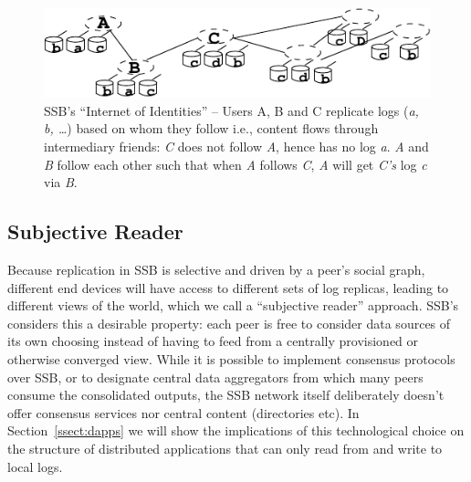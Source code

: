 \documentclass[10pt,sigconf,rewiew]{acmart}
\begin{document}
\begin{figure}[htb]
  \includegraphics[width=0.9\columnwidth]{figs/net-of-people.pdf}
  \caption{SSB's ``Internet of Identities'' -- {\rm\small Users A, B and C
    replicate logs ({\em a, b, \ldots}) based on whom they follow i.e., content
    flows through intermediary friends: {\em C} does not follow {\em A}, hence has no log {\em a}. {\em A} and {\em B} follow each other such that when {\em A} follows {\em C}, {\em A} will get {\em C's} log {\em c} via {\em B}.}\label{fig:net-of-people}}
\end{figure}


\subsection*{Subjective Reader}

Because replication in SSB is selective and driven by a peer's
social graph, different end devices will have access to different sets
of log replicas, leading to different views of the world, which we call
a ``subjective reader'' approach. SSB's considers this a desirable
property: each peer is free to
consider data sources of its own choosing instead of having to feed
from a centrally provisioned or otherwise converged view. While it is
possible to implement consensus protocols over SSB, or to designate
central data aggregators from which many peers consume the
consolidated outputs, the SSB network itself deliberately doesn't
offer consensus services nor central content (directories etc). In
Section~\ref{ssect:dapps} we will show the implications of this
technological choice on the structure of distributed applications that
can only read from and write to local logs.
\end{document}
